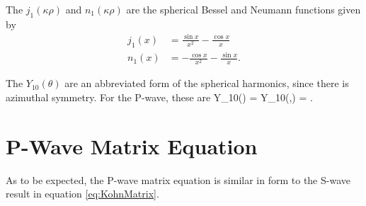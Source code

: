 \documentclass[Dissertation.tex]{subfiles}
\begin{document}
\noindent The $j_1(\kappa\rho)$ and $n_1(\kappa\rho)$ are the spherical Bessel and Neumann functions given by \cite[p. 729]{Arfken2005}
\begin{subequations}
\label{eq:PWaveBessel}
\begin{align}
j_1(x) & = \frac{\sin x}{x^2} - \frac{\cos x}{x} \label{eq:Bessel1} \\
n_1(x) & = -\frac{\cos x}{x^2} - \frac{\sin x}{x}. \label{eq:Neumann1}
\end{align}
\end{subequations}

\noindent The $Y_{10}(\theta)$ are an abbreviated form of the spherical harmonics, since there is azimuthal symmetry.  For the P-wave, these are
\beq
\label{eq:PWaveSpherHarm}
Y_{10}(\theta) = Y_{10}(\theta,\varphi) =  \cos\theta.
\eeq


\section{P-Wave Matrix Equation}
\label{sec:PWaveMatrix}

As to be expected, the P-wave matrix equation is similar in form to the S-wave result in equation \ref{eq:KohnMatrix}.
\end{document}
